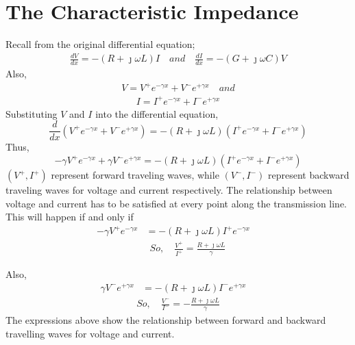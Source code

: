\section{The Characteristic Impedance}
Recall from the original differential equation;
\begin{align*}
\frac{dV}{dx} = -(R+\jmath\omega L)I \quad and\quad \frac{dI}{dx} = -(G+\jmath\omega C)V
\end{align*}
Also, 
\begin{align*}
V = V^+e^{-\gamma x}+V^-e^{+\gamma x}\quad and
\end{align*}
\begin{align*}
I = I^+e^{-\gamma x}+I^-e^{+\gamma x}
\end{align*}
Substituting $V$ and $I$ into the differential equation,
\[\frac{d}{dx}(V^+e^{-\gamma x}+V^-e^{+\gamma x}) = -(R+\jmath\omega L)(I^+e^{-\gamma x}+I^-e^{+\gamma x})\]
Thus,
\[-\gamma V^+e^{-\gamma x}+\gamma V^-e^{+\gamma x} = -(R+\jmath\omega L)(I^+e^{-\gamma x}+I^-e^{+\gamma x}) \]
$(V^+,I^+)$ represent forward traveling waves, while $(V^-,I^-)$ represent backward traveling waves for voltage and current respectively. The relationship between voltage and current has to be satisfied at every point along the transmission line. This will happen if and only if
\begin{align*}
-\gamma V^+e^{-\gamma x} &= -(R+\jmath\omega L)I^+e^{-\gamma x}\quad
\end{align*}
\begin{align*}
\quad\quad So,\quad \frac{V^+}{I^+} = \frac{R+\jmath\omega L}{\gamma}
\end{align*}

\quad Also, 
\begin{align*}
\gamma V^-e^{+\gamma x} &= -(R+\jmath\omega L)I^-e^{+\gamma x}\quad 
\end{align*}
\begin{align*}
So,\quad \frac{V^-}{I^-} = -\frac{R+\jmath\omega L}{\gamma}
\end{align*}
The expressions above show the relationship between forward and backward travelling waves for voltage and current.

